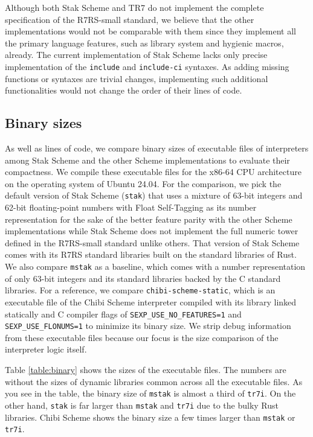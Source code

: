 \documentclass[sigplan]{acmart}
\begin{document}
Although both Stak Scheme and TR7 do not implement the complete
specification of the R7RS-small standard, we believe that the other
implementations would not be comparable with them since
they implement all the primary language features,
such as library system and hygienic macros, already.
The current implementation of Stak Scheme lacks only precise
implementation of the \texttt{include} and \texttt{include-ci} syntaxes.
As adding missing functions or syntaxes are trivial changes,
implementing such additional functionalities would not change the
order of their lines of code.

\subsection{Binary sizes}

As well as lines of code, we compare binary sizes of executable files of
interpreters among Stak Scheme and the other Scheme implementations
to evaluate their compactness.
We compile these executable files for the x86-64 CPU architecture on
the operating system of Ubuntu 24.04.
For the comparison, we pick the default version of Stak Scheme (\texttt{stak})
that uses a mixture of 63-bit integers and 62-bit floating-point
numbers with Float Self-Tagging \cite{floatselftag} as its number
representation for the sake of the better feature parity with
the other Scheme implementations while Stak Scheme does not implement
the full numeric tower defined in the R7RS-small standard unlike others.
That version of Stak Scheme comes with its R7RS standard libraries built on
the standard libraries of Rust.
We also compare \texttt{mstak} as a baseline, which comes with a number
representation of only 63-bit integers and its standard libraries backed
by the C standard libraries.
For a reference, we compare \texttt{chibi-scheme-static}, which is an
executable file of the Chibi Scheme interpreter compiled with its library linked
statically and C compiler flags of \texttt{SEXP\_USE\_NO\_FEATURES=1} and
\texttt{SEXP\_USE\_FLONUMS=1} to minimize its binary size.
We strip debug information from these executable files because
our focus is the size comparison of the interpreter logic itself.

Table \ref{table:binary} shows the sizes of the executable files.
The numbers are without the sizes of dynamic libraries common across
all the executable files.
As you see in the table, the binary size of \texttt{mstak} is almost
a third of \texttt{tr7i}.
On the other hand, \texttt{stak} is far larger than \texttt{mstak} and
\texttt{tr7i} due to the bulky Rust libraries.
Chibi Scheme shows the binary size a few times larger than \texttt{mstak} or
\texttt{tr7i}.
\end{document}
